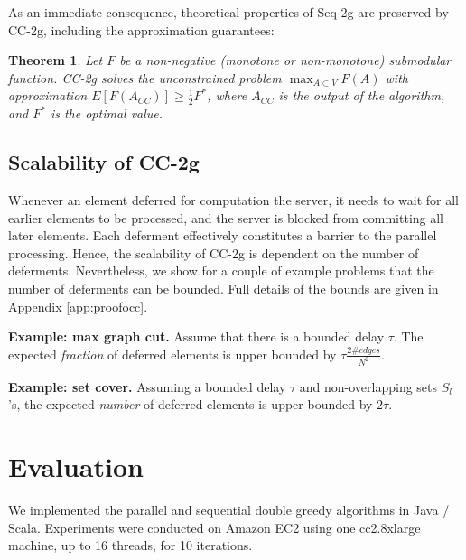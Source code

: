\documentclass{article} %
\newcommand{\occ}{CC-2g}
\newcommand{\seqalg}{Seq-2g}
\newcommand{\occshort}{CC}
\newtheorem{thm}{Theorem}[section]
\begin{document}
As an immediate consequence, theoretical properties of \seqalg{} are preserved by \occ{}, including the approximation guarantees:

\begin{thm} Let $F$ be a non-negative (monotone or non-monotone) submodular function.
\occ{} solves the unconstrained problem $\max_{A\subset V} F(A)$ with approximation
$E[F(A_{\occshort{}})] \geq \frac{1}{2}F^*$,
where $A_{\occshort{}}$ is the output of the algorithm, and $F^*$ is the optimal value.
\end{thm}




\subsection{Scalability of \occ{}}
Whenever an element deferred for computation the server, it needs to wait for all earlier elements to be processed, and the server is blocked from committing all later elements.
Each deferment effectively constitutes a barrier to the parallel processing.
Hence, the scalability of \occ{} is dependent on the number of deferments.
Nevertheless, we show for a couple of example problems that the number of deferments can be bounded.
Full details of the bounds are given in Appendix \ref{app:proofocc}.

\textbf{Example: max graph cut.}
Assume that there is a bounded delay $\tau$.
The expected \emph{fraction} of deferred elements is upper bounded by $\tau \frac{2\#edges}{N^2}$.

\textbf{Example: set cover.}
Assuming a bounded delay $\tau$ and non-overlapping sets $S_l$'s, the expected \emph{number} of deferred elements is upper bounded by $2\tau$.

















\section{Evaluation \label{sec:evaluation}}

We implemented the parallel and sequential double greedy algorithms in Java / Scala.
Experiments were conducted on Amazon EC2 using one cc2.8xlarge machine, up to 16 threads, for 10 iterations.
\end{document}
